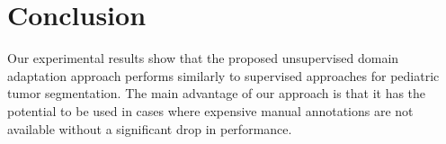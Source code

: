 \documentclass[runningheads]{llncs}
\begin{document}




\section{Conclusion}


Our experimental results show that the proposed unsupervised domain adaptation approach performs similarly to supervised approaches for pediatric tumor segmentation. The main advantage of our approach is that it has the potential to be used in cases where expensive manual annotations are not available without a significant drop in performance.
\end{document}
